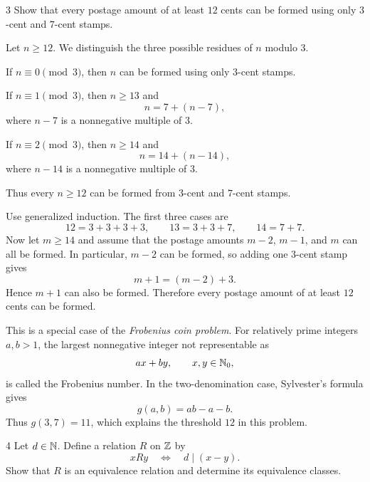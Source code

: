 \documentclass[11pt,oneside]{article}
\begin{document}
\begin{problem}{3}
Show that every postage amount of at least $12$ cents can be formed using only $3$-cent and $7$-cent stamps.
\end{problem}

\begin{solution}[1]
Let $n\geq12$. We distinguish the three possible residues of $n$ modulo $3$.
\begin{problemchoices}
    \item If $n\equiv0\pmod3$, then $n$ can be formed using only $3$-cent stamps.
    \item If $n\equiv1\pmod3$, then $n\geq13$ and
    \[
        n=7+(n-7),
    \]
    where $n-7$ is a nonnegative multiple of $3$.
    \item If $n\equiv2\pmod3$, then $n\geq14$ and
    \[
        n=14+(n-14),
    \]
    where $n-14$ is a nonnegative multiple of $3$.
\end{problemchoices}
Thus every $n\geq12$ can be formed from $3$-cent and $7$-cent stamps.
\end{solution}

\begin{solution}[2]
Use generalized induction. The first three cases are
\[
    12=3+3+3+3,
    \qquad
    13=3+3+7,
    \qquad
    14=7+7.
\]
Now let $m\geq14$ and assume that the postage amounts $m-2$, $m-1$, and $m$ can all be formed. In particular, $m-2$ can be formed, so adding one $3$-cent stamp gives
\[
    m+1=(m-2)+3.
\]
Hence $m+1$ can also be formed. Therefore every postage amount of at least $12$ cents can be formed.
\end{solution}

\begin{remark}
This is a special case of the \emph{Frobenius coin problem}. For relatively prime integers $a,b>1$, the largest nonnegative integer not representable as
\[
    ax+by,
    \qquad x,y\in\mathbb{N}_0,
\]
is called the Frobenius number. In the two-denomination case, Sylvester's formula gives
\[
    g(a,b)=ab-a-b.
\]
Thus $g(3,7)=11$, which explains the threshold $12$ in this problem.
\end{remark}

\begin{problem}{4}
Let $d\in\mathbb{N}$. Define a relation $R$ on $\mathbb{Z}$ by
\[
    xRy
    \quad\Longleftrightarrow\quad
    d\mid(x-y).
\]
Show that $R$ is an equivalence relation and determine its equivalence classes.
\end{problem}
\end{document}
